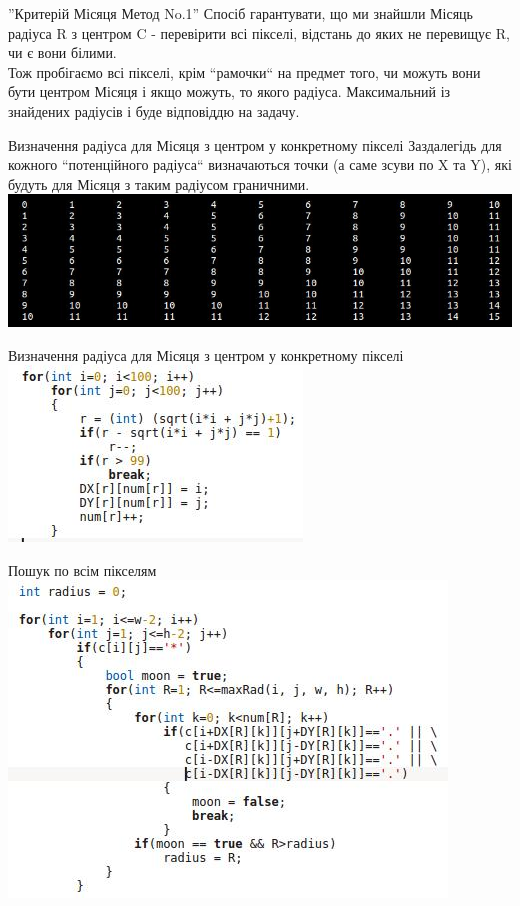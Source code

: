 \documentclass{beamer}
\begin{document}
\begin{frame}{''Критерій Місяця Метод No.1''}
Спосіб гарантувати, що ми знайшли Місяць радіуса R з центром C - перевірити всі пікселі, відстань до яких не перевищує R, чи є вони білими.
\\
Тож пробігаємо всі пікселі, крім ``рамочки`` на предмет того, чи можуть вони бути центром Місяця і якщо можуть, то якого радіуса. Максимальний із знайдених радіусів і буде відповіддю на задачу.
\end{frame}

\begin{frame}{Визначення радіуса для Місяця з центром у конкретному пікселі}
Заздалегідь для кожного ``потенційного радіуса`` визначаються точки (а саме зсуви по X та Y), які будуть для Місяця з таким радіусом граничними.
\\
\includegraphics[scale=0.4]{maxrad.jpg}
\end{frame}

\begin{frame}{Визначення радіуса для Місяця з центром у конкретному пікселі}
\includegraphics[scale=0.5]{maxradcode.jpg}
\end{frame}

\begin{frame}{Пошук по всім пікселям}
\includegraphics[scale=0.5]{runallpixels.jpg}
\end{frame}
\end{document}
